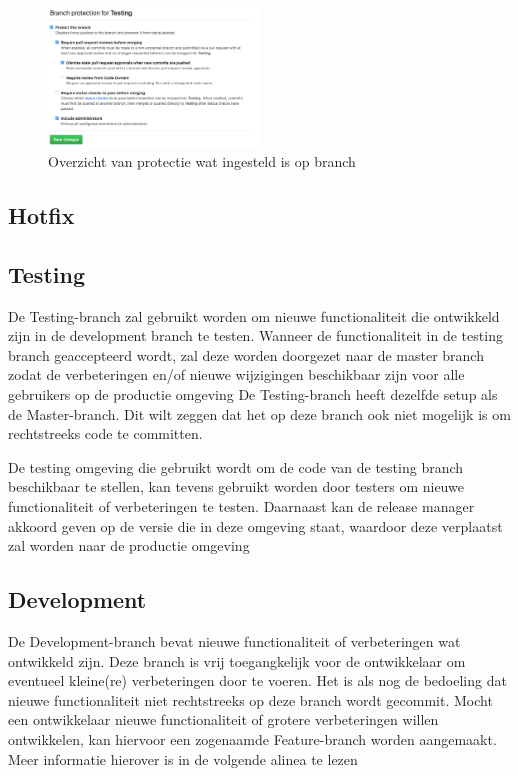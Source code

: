 	
	\begin{figure}[H]
	\includegraphics[width=0.5\textwidth]{images/BranchProtectionSetup.png}
	\caption{Overzicht van protectie wat ingesteld is op branch}
	\label{fig:BranchProtectionSetup}
	\end{figure}

	\subsection{Hotfix}
	
	\subsection{Testing}
	De Testing-branch zal gebruikt worden om nieuwe functionaliteit die ontwikkeld zijn in de development branch te testen. Wanneer de functionaliteit in de testing branch geaccepteerd wordt, zal deze worden doorgezet naar de master branch zodat de verbeteringen en/of nieuwe wijzigingen beschikbaar zijn voor alle gebruikers op de productie omgeving
	De Testing-branch heeft dezelfde setup als de Master-branch. Dit wilt zeggen dat het op deze branch ook niet mogelijk is om rechtstreeks code te committen.
	
	De testing omgeving die gebruikt wordt om de code van de testing branch beschikbaar te stellen, kan tevens gebruikt worden door testers om nieuwe functionaliteit of verbeteringen te testen. Daarnaast kan de release manager akkoord geven op de versie die in deze omgeving staat, waardoor deze verplaatst zal worden naar de productie omgeving
	\subsection{Development}
	
	De Development-branch bevat nieuwe functionaliteit of verbeteringen wat ontwikkeld zijn. Deze branch is vrij toegangkelijk voor de ontwikkelaar om eventueel kleine(re) verbeteringen door te voeren.	
	Het is als nog de bedoeling dat nieuwe functionaliteit niet rechtstreeks op deze branch wordt gecommit. Mocht een ontwikkelaar nieuwe functionaliteit of grotere verbeteringen willen ontwikkelen, kan hiervoor een zogenaamde Feature-branch worden aangemaakt. Meer informatie hierover is in de volgende alinea te lezen
	
